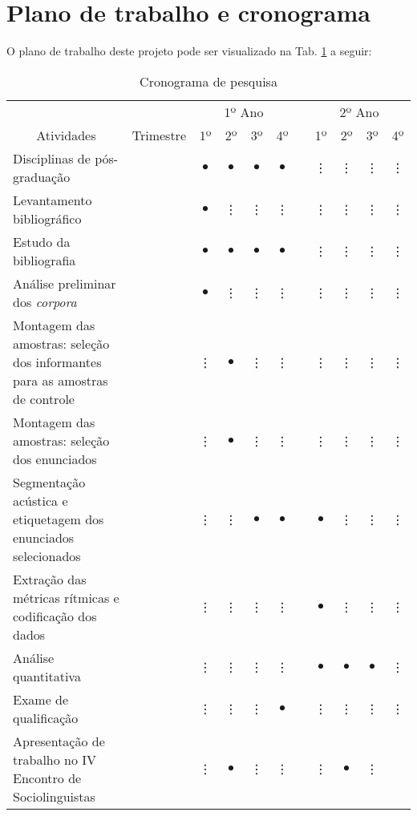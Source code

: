 \documentclass[
		a4paper,	%
		12pt,		%
		]{article}	%
\begin{document}
	\section{Plano de trabalho e cronograma} \label{plano}

	O plano de trabalho deste projeto pode ser visualizado na Tab.
	\ref{tab-crono} a seguir:

	\begin{table}[h!]
		\caption{Cronograma de pesquisa}
		\label{tab-crono}
		\begin{tabular}{m{.44\linewidth}cccccccccc}
			\hline
			\hline
			&& \multicolumn{4}{c}{1º Ano} &&
			\multicolumn{4}{c}{2º Ano} \\
			\cline{3-6}\cline{8-11}
			\multicolumn{1}{c}{Atividades}& Trimestre & 1º & 2º & 3º & 4º & & 1º & 2º & 3º & 4º \\
			\hline
			Disciplinas de pós-graduação
			&&$\bullet$&$\bullet$&$\bullet$&$\bullet$ &&\vdots&\vdots&\vdots &\vdots \\  
			\rowcolor{cinza1}
			Levantamento bibliográfico
			&&$\bullet$&\vdots&\vdots&\vdots&&\vdots&\vdots&\vdots&\vdots \\  
			Estudo da bibliografia &&$\bullet$&$\bullet$&$\bullet$&$\bullet$&&\vdots&\vdots&\vdots &\vdots \\  
			\rowcolor{cinza1}
			Análise preliminar dos \emph{corpora}
			&&$\bullet$&\vdots&\vdots&\vdots&&\vdots&\vdots&\vdots &\vdots \\  
			Montagem das amostras: seleção dos informantes para as amostras de
			controle &&\vdots&$\bullet$&\vdots&\vdots&&\vdots&\vdots&\vdots &\vdots \\  
			\rowcolor{cinza1}
			Montagem das amostras: seleção dos enunciados &&\vdots&$\bullet$&\vdots&\vdots&&\vdots&\vdots&\vdots &\vdots \\  
			Segmentação acústica e etiquetagem dos enunciados selecionados
			&&\vdots&\vdots&$\bullet$&$\bullet$&&$\bullet$&\vdots&\vdots &\vdots \\  	
			\rowcolor{cinza1}
			Extração das métricas rítmicas e codificação dos dados &&\vdots&\vdots&\vdots&\vdots&&$\bullet$&\vdots&\vdots &\vdots \\  
			Análise quantitativa &&\vdots&\vdots&\vdots&\vdots&&$\bullet$&$\bullet$&$\bullet$ &\vdots \\  
			\rowcolor{cinza1}
			Exame de qualificação &&\vdots&\vdots&\vdots&$\bullet$&&\vdots&\vdots&\vdots &\vdots \\  
			Apresentação de trabalho no IV Encontro de Sociolinguistas &&\vdots&$\bullet$&\vdots&\vdots&&\vdots&$\bullet$&\vdots

\end{tabular}
\end{table}
\end{document}
